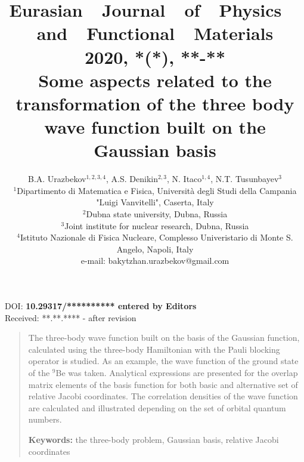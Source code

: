 \documentclass[12pt,a4paper,twoside]{article}
\begin{document}

\newenvironment{sciabstract}{
\begin{quote} \scriptsize}
{\end{quote}}

\pretitle{\begin{center}\Huge\bfseries} %

\title{{\normalsize{Eurasian~~Journal~~of~~Physics~~and~~Functional~~Materials\\ 
2020, \textbf{*}(*),   **-**}} \\[2.0cm]%
Some aspects related to the transformation of the three body wave function built on the Gaussian basis}%

\author
{B.A. Urazbekov$^{1,2,3,4}$, A.S. Denikin$^{2,3}$, N. Itaco$^{1,4}$, N.T. Tusunbayev$^3$\\ 
\scriptsize{$^1$Dipartimento di Matematica e Fisica, Universit\`a degli Studi della Campania "Luigi Vanvitelli", Caserta, Italy }\\
\scriptsize{$^2$Dubna state university, Dubna, Russia}\\
\scriptsize{$^3$Joint institute for nuclear research, Dubna, Russia}\\
\scriptsize{$^4$Istituto Nazionale di Fisica Nucleare, Complesso Univeristario di Monte S. Angelo, Napoli, Italy}\\
\scriptsize{e-mail: bakytzhan.urazbekov@gmail.com}\\%
}

\date{}%
\maketitle

\begin{flushleft}
\scriptsize{ DOI: \textbf{ 10.29317/********** entered by Editors}\\
Received: **.**.**** - after revision}

\end{flushleft} 

\begin{sciabstract}%

The three-body wave function built on the basis of the Gaussian function, calculated using the three-body Hamiltonian with the Pauli blocking operator is studied. As an example, the wave function of the ground state of the $^9$Be was taken. Analytical expressions are presented for the overlap matrix elements of the basis function for both basic and alternative set of relative Jacobi coordinates. The correlation densities of the wave function are calculated and illustrated depending on the set of orbital quantum numbers.


{\textbf{Keywords:} the three-body problem, Gaussian basis, relative Jacobi coordinates}

\end{sciabstract}
\end{document}
